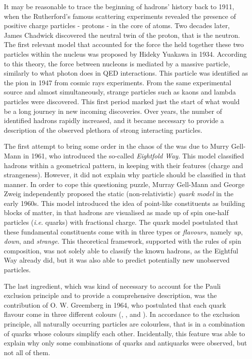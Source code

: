 It may be reasonable to trace the beginning of hadrons' history back to 1911, when the Rutherford's famous scattering experiments revealed the presence of positive charge particles - protons - in the core of atoms. Two decades later, James Chadwick discovered the neutral twin of the proton, that is the neutron. The first relevant model that accounted for the force the held together these two particles within the nucleus was proposed by Hideky Yuakawa in 1934. According to this theory, the force between nucleons is mediated by a massive particle, similarly to what photon does in QED interactions. This particle was identified as the pion in 1947 from cosmic rays experiments. From the same experimental source and almost simultaneously, strange particles such as kaons and lambda particles were discovered. This first period marked just the start of what would be a long journey in new incoming discoveries. Over years, the number of identified hadrons rapidly increased, and it became necessary to provide a description of the observed plethora of strong interacting particles.%

The first attempt to bring some order in the chaos of the  was due to Murry Gell-Mann in 1961, who introduced the so-called \textit{Eightfold Way}. This model classified hadrons within a geometrical pattern, in keeping with their features (charge and strangeness). However, it did not explain why particle should be classified in that manner. In order to cope this questioning puzzle, Murray Gell-Mann and George Zweig independently proposed the static (non-relativistic) \textit{quark model} in the early 1960s. This model introduced the idea of point-like constituents as building blocks of matter, in that hadrons are visualised as made up of spin one-half particles (\textit{i.e.} quarks) with fractional charge. The quark model postulated that these fundamental constituents come with in three types or \textit{flavours}, namely \textit{up}, \textit{down}, and \textit{strange}. This theoretical framework, supported with the rules of spin composition, was not solely able to classify the known hadrons, as the Eightful Way already did, but it was also able to predict potentially new unobserved particles.%

The last ingredient, which was kind of necessary to account for the Pauli exclusion principle and to provide a comprehensive description, was the contribution of O. W. Greemberg in 1964, who postulated that each quark flavour come in three different colours (, , and ). In accordance to the exclusion principle, all naturally occurring particles are colourless, that is in a combination of quarks whose colours simplify each other. Incidentally, this feature was able to explain why only some combinations of quarks and antiquarks were observed, but not all of them.%

